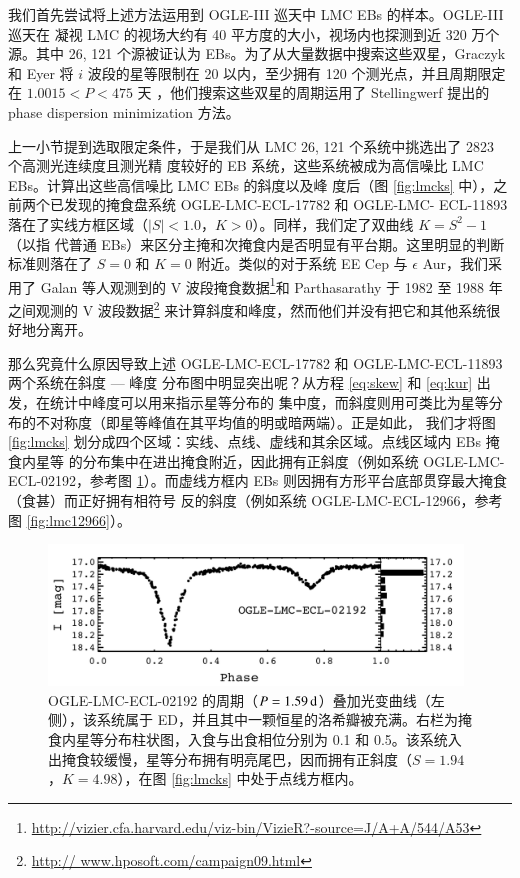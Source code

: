 我们首先尝试将上述方法运用到 OGLE-III 巡天中 LMC EBs 的样本\cite{Graczyk2011}。OGLE-III 巡天在
凝视 LMC 的视场大约有 40 平方度的大小，视场内也探测到近 320 万个源\cite{Ulaczyk2012}。其中 
26, 121 个源被证认为 EBs\cite{Graczyk2011}。为了从大量数据中搜索这些双星，Graczyk 和 Eyer 将 $i$ 
波段的星等限制在 20 以内，至少拥有 120 个测光点，并且周期限定在 $1.0015 < P< 475$ 天
\cite{Graczyk2010}，他们搜索这些双星的周期运用了 Stellingwerf 提出的 phase dispersion minimization 
方法\cite{Stellingwerf1978}。

上一小节提到选取限定条件，于是我们从 LMC 26, 121 个系统中挑选出了 2823 个高测光连续度且测光精
度较好的 EB 系统，这些系统被成为高信噪比 LMC EBs。计算出这些高信噪比 LMC EBs 的斜度以及峰
度后（图 \ref{fig:lmcks} 中），之前两个已发现的掩食盘系统 OGLE-LMC-ECL-17782 和 OGLE-LMC-
ECL-11893 落在了实线方框区域（$|S| < 1.0$，$K > 0$）。同样，我们定了双曲线 $K = S^2 - 1$（以指
代普通 EBs）来区分主掩和次掩食内是否明显有平台期。这里明显的判断标准则落在了 $S = 0$ 和 $K = 
0$ 附近。类似的对于系统 EE Cep 与  $\epsilon$ Aur，我们采用了 Galan 等人\cite{Galan2012}观测到的 
V 波段掩食数据\footnote{\url{http://vizier.cfa.harvard.edu/viz-bin/VizieR?-source=J/A+A/544/A53}}和 
Parthasarathy 于 1982 至 1988 年之间\cite{Parthasarathy1986}观测的 V 波段数据\footnote{\url{http://
www.hposoft.com/campaign09.html}} 来计算斜度和峰度，然而他们并没有把它和其他系统很好地分离开。

那么究竟什么原因导致上述 OGLE-LMC-ECL-17782 和 OGLE-LMC-ECL-11893 两个系统在斜度 --- 峰度
分布图中明显突出呢？从方程 \ref{eq:skew} 和 \ref{eq:kur} 出发，在统计中峰度可以用来指示星等分布的
集中度，而斜度则用可类比为星等分布的不对称度（即星等峰值在其平均值的明或暗两端）。正是如此，
我们才将图 \ref{fig:lmcks} 划分成四个区域：实线、点线、虚线和其余区域。点线区域内 EBs 掩食内星等
的分布集中在进出掩食附近，因此拥有正斜度（例如系统 OGLE-LMC-ECL-02192，参考图 
\ref{fig:lmc02192}）。而虚线方框内 EBs 则因拥有方形平台底部贯穿最大掩食（食甚）而正好拥有相符号
反的斜度（例如系统 OGLE-LMC-ECL-12966，参考图 \ref{fig:lmc12966}）。

\begin{figure}[t]
\centering
\includegraphics[width=0.98\textwidth,trim={0.0in 0.2in 0 0}]{figures/chapter3/f6_lmc02192.pdf}
\caption{OGLE-LMC-ECL-02192 的周期（$P = 1.59\, \mathrm{d}$）叠加光变曲线（左侧），该系统属于 ED，并且其中一颗恒星的洛希瓣被充满。右栏为掩食内星等分布柱状图，入食与出食相位分别为 0.1 和 0.5。该系统入出掩食较缓慢，星等分布拥有明亮尾巴，因而拥有正斜度（$S=1.94$，$K=4.98$），在图 \ref{fig:lmcks} 中处于点线方框内。}
\label{fig:lmc02192}
\end{figure}

